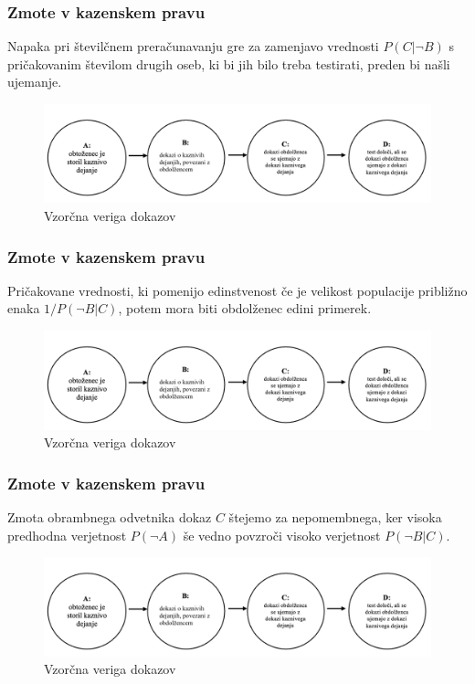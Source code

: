 \documentclass{beamer}
\begin{document}
\begin{frame}
    \frametitle{Zmote v kazenskem pravu}
    \begin{block}{Napaka pri številčnem preračunavanju}
        gre za zamenjavo vrednosti $P(C \lvert \neg B)$ s pričakovanim številom drugih oseb, ki bi jih bilo treba testirati, preden bi našli ujemanje.
    \end{block}
    \begin{figure}[!ht]\label{fig:slika_3}
        \centering
        \includegraphics[scale=0.50]{slika_3.png}
        \caption{Vzorčna veriga dokazov}
    \end{figure}
\end{frame}

\begin{frame}
    \frametitle{Zmote v kazenskem pravu}
    \begin{block}{Pričakovane vrednosti, ki pomenijo edinstvenost}
        če je velikost populacije približno enaka $1/P(\neg B \lvert C)$, potem mora biti
        obdolženec edini primerek.
    \end{block}
    \begin{figure}[!ht]\label{fig:slika_3}
        \centering
        \includegraphics[scale=0.50]{slika_3.png}
        \caption{Vzorčna veriga dokazov}
    \end{figure}
\end{frame}

\begin{frame}
    \frametitle{Zmote v kazenskem pravu}
    \begin{block}{Zmota obrambnega odvetnika}
        dokaz $C$ štejemo za nepomembnega, ker visoka predhodna verjetnost $P(\neg A)$ še vedno povzroči visoko verjetnost $P(\neg B \lvert C)$.    
    \end{block}
    \begin{figure}[!ht]\label{fig:slika_3}
        \centering
        \includegraphics[scale=0.50]{slika_3.png}
        \caption{Vzorčna veriga dokazov}
    \end{figure}
\end{frame}
\end{document}
